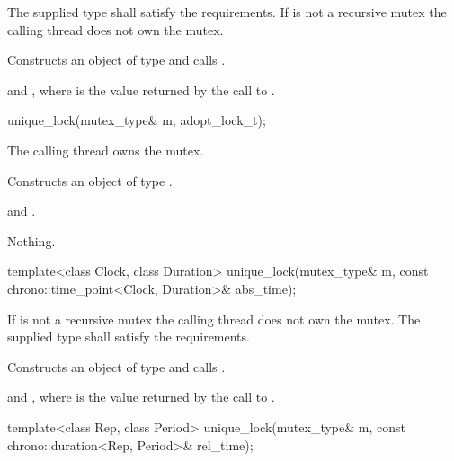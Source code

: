 \begin{itemdescr}
\pnum
\requires
The supplied  type shall satisfy the 
requirements.
If  is not a recursive mutex the calling thread does not own the mutex.

\pnum
\effects Constructs an object of type  and calls .

\pnum
\postconditions {} and ,
where  is the value returned by the call to .
\end{itemdescr}

%
\begin{itemdecl}
unique_lock(mutex_type& m, adopt_lock_t);
\end{itemdecl}

\begin{itemdescr}
\pnum
\requires The calling thread owns the mutex.

\pnum
\effects Constructs an object of type .

\pnum
\postconditions {} and .

\pnum
\throws Nothing.
\end{itemdescr}

%
\begin{itemdecl}
template<class Clock, class Duration>
  unique_lock(mutex_type& m, const chrono::time_point<Clock, Duration>& abs_time);
\end{itemdecl}

\begin{itemdescr}
\pnum
\requires If  is not a recursive mutex the calling thread
does not own the mutex. The supplied  type shall satisfy the
 requirements.

\pnum
\effects Constructs an object of type  and calls .

\pnum
\postconditions {} and ,
where  is
the value returned by the call to .
\end{itemdescr}

%
\begin{itemdecl}
template<class Rep, class Period>
  unique_lock(mutex_type& m, const chrono::duration<Rep, Period>& rel_time);
\end{itemdecl}

